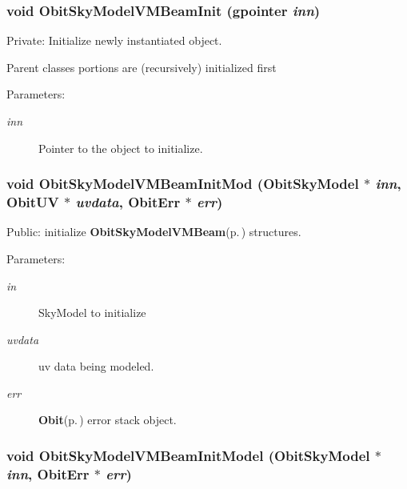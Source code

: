 \subsubsection{\setlength{\rightskip}{0pt plus 5cm}void Obit\-Sky\-Model\-VMBeam\-Init (gpointer {\em inn})}\label{ObitSkyModelVMBeam_8c_a6}


Private: Initialize newly instantiated object. 

Parent classes portions are (recursively) initialized first \begin{Desc}
\item[Parameters:]
\begin{description}
\item[{\em inn}]Pointer to the object to initialize. \end{description}
\end{Desc}
\subsubsection{\setlength{\rightskip}{0pt plus 5cm}void Obit\-Sky\-Model\-VMBeam\-Init\-Mod ({\bf Obit\-Sky\-Model} $\ast$ {\em inn}, {\bf Obit\-UV} $\ast$ {\em uvdata}, {\bf Obit\-Err} $\ast$ {\em err})}\label{ObitSkyModelVMBeam_8c_a16}


Public: initialize {\bf Obit\-Sky\-Model\-VMBeam}{\rm (p.\,\pageref{structObitSkyModelVMBeam})} structures. 

\begin{Desc}
\item[Parameters:]
\begin{description}
\item[{\em in}]Sky\-Model to initialize \item[{\em uvdata}]uv data being modeled. \item[{\em err}]{\bf Obit}{\rm (p.\,\pageref{structObit})} error stack object. \end{description}
\end{Desc}
\subsubsection{\setlength{\rightskip}{0pt plus 5cm}void Obit\-Sky\-Model\-VMBeam\-Init\-Model ({\bf Obit\-Sky\-Model} $\ast$ {\em inn}, {\bf Obit\-Err} $\ast$ {\em err})}\label{ObitSkyModelVMBeam_8c_a18}


